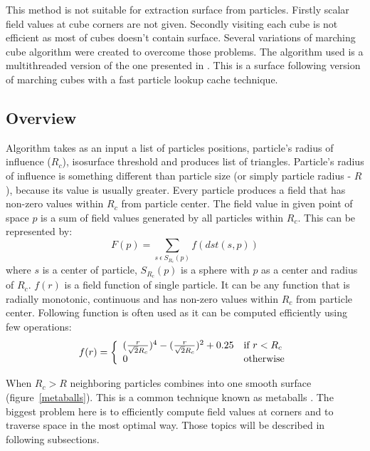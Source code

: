 This method is not suitable for extraction surface from particles. Firstly scalar field values at cube corners are not given. Secondly visiting each cube is not efficient as most of cubes doesn't contain surface. Several variations of marching cube algorithm were created to overcome those problems. The algorithm used is a multithreaded version of the one presented in \cite{RosenbergBirdwell2008}. This is a surface following version of marching cubes with a fast particle lookup cache technique. 

\subsection{Overview} \label{sec:iso_overview}
Algorithm takes as an input a list of particles positions, particle's radius of influence ($R_c$), isosurface threshold and produces list of triangles. Particle's radius of influence is something different than particle size (or simply particle radius - $R$), because its value is usually greater. Every particle produces a field that has non-zero values within $R_c$ from particle center. The field value in given point of space $p$ is a sum of field values generated by all particles within $R_c$. This can be represented by:
\begin{equation}
\label{eq:field_equation}
F(p) = \sum_{s~\epsilon~S_{R_c}(p)} f(dst(s, p))
\end{equation}
where $s$ is a center of particle, $S_{R_c}(p)$ is a sphere with $p$ as a center and radius of $R_c$. $f(r)$ is a field function of single particle. It can be any function that is radially monotonic, continuous and has non-zero values within $R_c$ from particle center. Following function is often used as it can be computed efficiently using few operations:
\begin{equation}
\label{eq:single_field_equation}
f(r) = \left\{ \begin{array}{ll}
({r \over \sqrt{2}R_c} )^4 - ( {r \over \sqrt{2}R_c} )^2 + 0.25 & \textrm{if $r < R_c$}\\
0 & \textrm{otherwise}\\
\end{array} \right.
\end{equation}

When $R_c > R$ neighboring particles combines into one smooth surface  (figure~\ref{metaballs}). This is a common technique known as metaballs \cite{Blinn1982}. The biggest problem here is to efficiently compute field values at corners and to traverse space in the most optimal way. Those topics will be described in following subsections.

